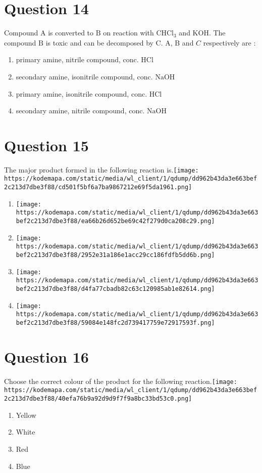\documentclass{article}
\begin{document}
\section*{Question 14}
Compound \(\mathrm{A}\) is converted to \(\mathrm{B}\) on reaction with \(\mathrm{CHCl}_3\) and \(\mathrm{KOH}\). The compound \(\mathrm{B}\) is toxic and can be decomposed by C. A, B and \(C\) respectively are :
\begin{enumerate}[label=(\alph*)]
\item primary amine, nitrile compound, conc. \(\mathrm{HCl}\)
\item secondary amine, isonitrile compound, conc. \(\mathrm{NaOH}\)
\item primary amine, isonitrile compound, conc. \(\mathrm{HCl}\)
\item secondary amine, nitrile compound, conc. \(\mathrm{NaOH}\)
\end{enumerate}
\newpage
\section*{Question 15}
The major product formed in the following reaction is.\texttt{[image: https://kodemapa.com/static/media/wl\_client/1/qdump/dd962b43da3e663bef2c213d7dbe3f88/cd501f5bf6a7ba9867212e69f5da1961.png]}\newline
\begin{enumerate}[label=(\alph*)]
\item \texttt{[image: https://kodemapa.com/static/media/wl\_client/1/qdump/dd962b43da3e663bef2c213d7dbe3f88/ea66b26d652be69c42f279d0ca208c29.png]}
\item \texttt{[image: https://kodemapa.com/static/media/wl\_client/1/qdump/dd962b43da3e663bef2c213d7dbe3f88/2952e31a186e1acc29cc186fdfb5dd6b.png]}
\item \texttt{[image: https://kodemapa.com/static/media/wl\_client/1/qdump/dd962b43da3e663bef2c213d7dbe3f88/d4fa77cbadb82c63c120985ab1e82614.png]}
\item \texttt{[image: https://kodemapa.com/static/media/wl\_client/1/qdump/dd962b43da3e663bef2c213d7dbe3f88/59084e148fc2d739417759e72917593f.png]}
\end{enumerate}
\newpage
\section*{Question 16}
Choose the correct colour of the product for the following reaction.\texttt{[image: https://kodemapa.com/static/media/wl\_client/1/qdump/dd962b43da3e663bef2c213d7dbe3f88/40efa76b9a92d9d9f7f9a8bc33bd53c0.png]}\newline
\begin{enumerate}[label=(\alph*)]
\item Yellow
\item White
\item Red
\item Blue
\end{enumerate}
\newpage
\end{document}
